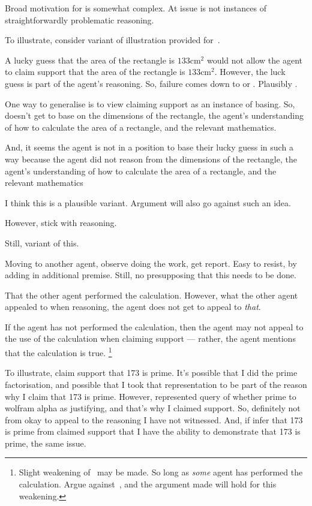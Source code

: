 \begin{note}
  Broad motivation for \ESU{} is somewhat complex.
  At issue is not instances of straightforwardly problematic reasoning.

  To illustrate, consider variant of illustration provided for~\USE{}.

  A lucky guess that the area of the rectangle is \(133\text{cm}^{2}\) would not allow the agent to claim support that the area of the rectangle is \(133\text{cm}^{2}\).
  However, the luck guess is part of the agent's reasoning.
  So, failure comes down to \ideaS{} or \ideaCS{}.
  Plausibly \ideaCS{}.
\end{note}

\begin{note}[Illustration]
  One way to generalise is to view claiming support as an instance of basing.
  So, doesn't get to base on the dimensions of the rectangle, the agent's understanding of how to calculate the area of a rectangle, and the relevant mathematics.

  And, it seems the agent is not in a position to base their lucky guess in such a way because the agent did not reason from the dimensions of the rectangle, the agent's understanding of how to calculate the area of a rectangle, and the relevant mathematics

  I think this is a plausible variant.
  Argument will also go against such an idea.

  However, stick with reasoning.

  Still, variant of this.

  Moving to another agent, observe doing the work, get report.
  Easy to resist, by adding in additional premise.
  Still, no presupposing that this needs to be done.

  That the other agent performed the calculation.
  However, what the other agent appealed to when reasoning, the agent does not get to appeal to \emph{that}.

  If the agent has not performed the calculation, then the agent may not appeal to the use of the calculation when claiming support --- rather, the agent mentions that the calculation is true.\nolinebreak
  \footnote{
    Slight weakening of~\ESU{} may be made.
    So long as \emph{some} agent has performed the calculation.
    Argue against~\ESU{}, and the argument made will hold for this weakening.
  }
\end{note}

\begin{note}
  To illustrate, claim support that 173 is prime.
  It's possible that I did the prime factorisation, and possible that I took that representation to be part of the reason why I claim that 173 is prime.
  However, represented query of whether prime to wolfram alpha as justifying, and that's why I claimed support.
  So, definitely not from okay to appeal to the reasoning I have not witnessed.
  And, if infer that 173 is prime from claimed support that I have the ability to demonstrate that 173 is prime, the same issue.
\end{note}

